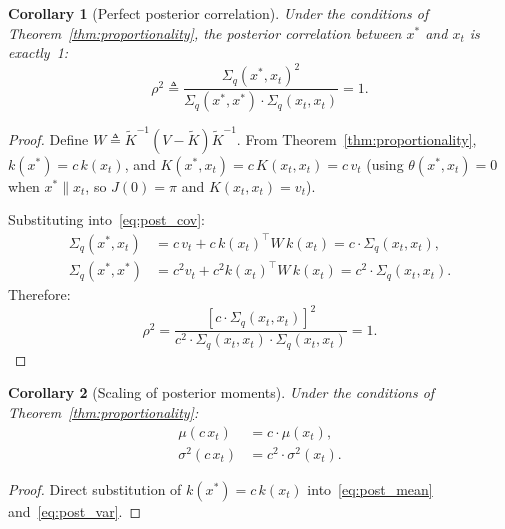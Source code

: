 \documentclass[11pt]{article}
\newtheorem{corollary}{Corollary}
\begin{document}
\begin{corollary}[Perfect posterior correlation]\label{cor:rho}
Under the conditions of Theorem~\ref{thm:proportionality}, the posterior correlation
between $x^*$ and $x_t$ is exactly~1:
\begin{equation}
    \rho^2 \triangleq \frac{\Sigma_q(x^*, x_t)^2}{\Sigma_q(x^*, x^*) \cdot \Sigma_q(x_t, x_t)} = 1.
\end{equation}
\end{corollary}

\begin{proof}
Define $W \triangleq \tilde{K}^{-1}(V - \tilde{K})\tilde{K}^{-1}$.
From Theorem~\ref{thm:proportionality}, $k(x^*) = c \, k(x_t)$, and
$K(x^*, x_t) = c \, K(x_t, x_t) = c \, v_t$ (using $\theta(x^*, x_t) = 0$
when $x^* \parallel x_t$, so $J(0) = \pi$ and $K(x_t, x_t) = v_t$).

Substituting into~\eqref{eq:post_cov}:
\begin{align}
    \Sigma_q(x^*, x_t) &= c \, v_t + c \, k(x_t)^\top W \, k(x_t) = c \cdot \Sigma_q(x_t, x_t), \label{eq:cov_scale}\\
    \Sigma_q(x^*, x^*) &= c^2 v_t + c^2 k(x_t)^\top W \, k(x_t) = c^2 \cdot \Sigma_q(x_t, x_t). \label{eq:var_scale}
\end{align}
Therefore:
\[
    \rho^2 = \frac{[c \cdot \Sigma_q(x_t, x_t)]^2}{c^2 \cdot \Sigma_q(x_t, x_t) \cdot \Sigma_q(x_t, x_t)} = 1.
\]
\end{proof}

\begin{corollary}[Scaling of posterior moments]\label{cor:moments}
Under the conditions of Theorem~\ref{thm:proportionality}:
\begin{align}
    \mu(c \, x_t) &= c \cdot \mu(x_t), \label{eq:mu_scale}\\
    \sigma^2(c \, x_t) &= c^2 \cdot \sigma^2(x_t). \label{eq:var_scale2}
\end{align}
\end{corollary}

\begin{proof}
Direct substitution of $k(x^*) = c \, k(x_t)$ into~\eqref{eq:post_mean} and~\eqref{eq:post_var}.
\end{proof}
\end{document}
